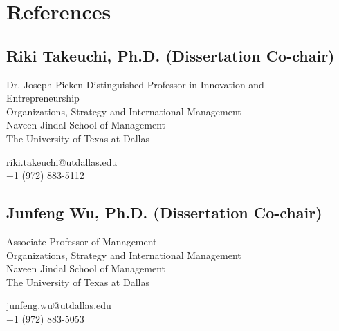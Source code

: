 \documentclass[12pt,letterpaper]{report} %
\begin{document}
\newpage

    \section*{References}

    \subsection*{Riki Takeuchi, Ph.D. (Dissertation Co-chair)}
        \begin{minipage}[t]{0.700\textwidth}
        Dr. Joseph Picken Distinguished Professor in Innovation and \\Entrepreneurship\\
        Organizations, Strategy and International Management\\
        Naveen Jindal School of Management\\
        The University of Texas at Dallas
        \end{minipage}
        \begin{minipage}[t]{0.295\textwidth}
        \flushright{}
        \href{mailto:riki.takeuchi@utdallas.edu}{riki.takeuchi@utdallas.edu} \\
        +1 (972) 883-5112
        \end{minipage}
        
    \subsection*{Junfeng Wu, Ph.D. (Dissertation Co-chair)}
        \begin{minipage}[t]{0.700\textwidth}
        Associate Professor of Management \\
        Organizations, Strategy and International Management \\
        Naveen Jindal School of Management \\
        The University of Texas at Dallas
    \end{minipage}
    \begin{minipage}[t]{0.295\textwidth}
        \flushright{}
        \href{mailto:junfeng.wu@utdallas.edu}{junfeng.wu@utdallas.edu} \\
        +1 (972) 883-5053 
    \end{minipage}
\end{document}
